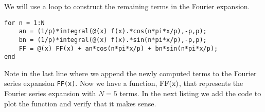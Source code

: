 We will use a loop to construct the remaining terms in the Fourier expansion.
\begin{lstlisting}[name=lec17-ex1,style=myMatlab]
for n = 1:N
    an = (1/p)*integral(@(x) f(x).*cos(n*pi*x/p),-p,p);
    bn = (1/p)*integral(@(x) f(x).*sin(n*pi*x/p),-p,p);
    FF = @(x) FF(x) + an*cos(n*pi*x/p) + bn*sin(n*pi*x/p); 
end
\end{lstlisting}
Note in the last line where we append the newly computed terms to the Fourier series expansion \lstinline{FF(x)}.  Now we have a function, $\lstinline{FF(x)}$, that represents the Fourier series expansion with $N=5$ terms.  In the next listing we add the code to plot the function and verify that it makes sense.

